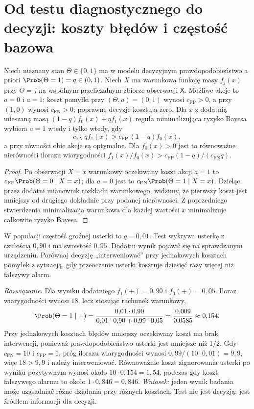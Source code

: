 \section{Od testu diagnostycznego do decyzji: koszty błędów i częstość bazowa}
\begin{twierdzenie}\label{thm:decision-lr}
Niech nieznany stan $\Theta\in\{0,1\}$ ma w modelu decyzyjnym
prawdopodobieństwo a priori $\Prob(\Theta=1)=q\in(0,1)$.
Niech $X$ ma warunkową funkcję masy $f_j(x)$ przy $\Theta=j$
na wspólnym przeliczalnym zbiorze obserwacji $\mathsf X$.
Możliwe akcje to $a=0$ i $a=1$; koszt pomyłki przy
$(\Theta,a)=(0,1)$ wynosi $c_{\mathrm{FP}}>0$, a przy $(1,0)$
wynosi $c_{\mathrm{FN}}>0$; poprawne decyzje kosztują zero.
Dla $x$ z dodatnią mieszaną masą
$(1-q)f_0(x)+qf_1(x)$ reguła minimalizująca ryzyko Bayesa
wybiera $a=1$ wtedy i tylko wtedy, gdy
\[
 c_{\mathrm{FN}}\,q f_1(x)
>c_{\mathrm{FP}}\,(1-q) f_0(x),
\]
a przy równości obie akcje są optymalne. Dla $f_0(x)>0$ jest to
równoważne nierówności ilorazu wiarygodności
$f_1(x)/f_0(x)>c_{\mathrm{FP}}(1-q)/(c_{\mathrm{FN}}q)$.
\end{twierdzenie}
\begin{proof}
Po obserwacji $X=x$ warunkowy oczekiwany koszt akcji $a=1$ to
$c_{\mathrm{FP}}\Prob(\Theta=0\mid X=x)$; dla $a=0$ jest to
$c_{\mathrm{FN}}\Prob(\Theta=1\mid X=x)$.
Dzieląc przez dodatni mianownik rozkładu warunkowego, widzimy, że
pierwszy koszt jest mniejszy od drugiego dokładnie przy podanej
nierówności. Z poprzedniego stwierdzenia minimalizacja warunkowa dla
każdej wartości $x$ minimalizuje całkowite ryzyko Bayesa.
\end{proof}

\begin{zadanie}\label{zad:rare-classification}
W populacji częstość groźnej usterki to $q=0{,}01$.
Test wykrywa usterkę z czułością $0{,}90$ i ma swoistość $0{,}95$.
Dodatni wynik pojawił się na sprawdzanym urządzeniu. Porównaj decyzję
„interweniować” przy jednakowych kosztach pomyłek z sytuacją,
gdy przeoczenie usterki kosztuje dziesięć razy więcej niż fałszywy alarm.
\par\emph{Rozwiązanie.}
Dla wyniku dodatniego $f_1(+)=0{,}90$ i $f_0(+)=0{,}05$.
Iloraz wiarygodności wynosi $18$, lecz stosując rachunek warunkowy,
\[
\Prob(\Theta=1\mid +)
=\frac{0{,}01\cdot0{,}90}
 {0{,}01\cdot0{,}90+0{,}99\cdot0{,}05}
=\frac{0{,}009}{0{,}0585}\approx0{,}154.
\]
Przy jednakowych kosztach błędów mniejszy oczekiwany koszt ma
brak interwencji, ponieważ prawdopodobieństwo usterki jest mniejsze niż
$1/2$. Gdy $c_{\mathrm{FN}}=10$ i $c_{\mathrm{FP}}=1$,
próg ilorazu wiarygodności wynosi
$0{,}99/(10\cdot0{,}01)=9{,}9$, więc $18>9{,}9$ i należy
interweniować. Równoważnie koszt zignorowania usterki po wyniku
pozytywnym wynosi około $10\cdot0{,}154=1{,}54$, podczas gdy koszt
fałszywego alarmu to około $1\cdot0{,}846=0{,}846$.
\emph{Wniosek:} jeden wynik badania może uzasadniać różne działania przy
różnych kosztach. Test nie jest decyzją; jest źródłem informacji dla decyzji.
\end{zadanie}

